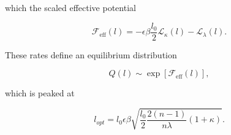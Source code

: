 \documentclass[10pt,a4paper]{article}
\begin{document}
\noindent which the scaled effective potential

\begin{equation}
	\mathcal{F}_\mathrm{eff}(l) = -\epsilon\beta\frac{l_0}{2}\mathcal{L}_\kappa(l) - \mathcal{L}_\lambda (l).
\end{equation}

\noindent These rates define an equilibrium distribution 

\begin{equation}
	Q(l) \sim \exp\left[ \mathcal{F}_\mathrm{eff}(l) \right],
\end{equation}

\noindent which is peaked at 

\begin{equation}
	l_{opt} = l_0\epsilon\beta\sqrt{\frac{l_0}{2}\frac{2(n-1)}{n\lambda}(1+\kappa)}.
\end{equation}


\end{document}
